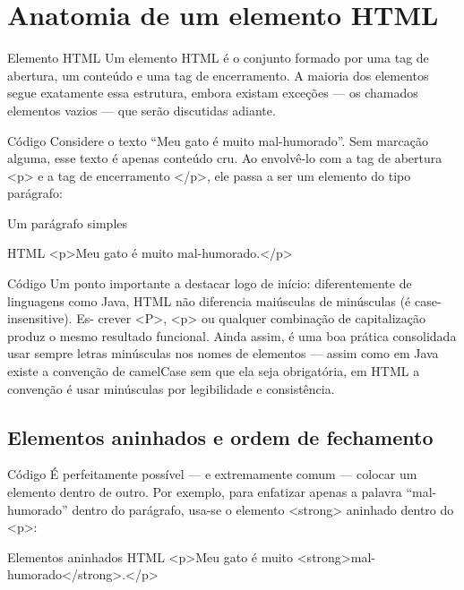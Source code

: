 \section{Anatomia de um elemento HTML}

\begin{infobox}{Elemento HTML}
Um elemento HTML é o conjunto formado por uma tag de abertura, um conteúdo e uma tag de encerramento. A maioria dos elementos segue exatamente essa estrutura, embora existam exceções — os chamados elementos vazios — que serão discutidas adiante.
\end{infobox}

\begin{codebox}{Código}
Considere o texto “Meu gato é muito mal-humorado”. Sem marcação alguma, esse
texto é apenas conteúdo cru. Ao envolvê-lo com a tag de abertura <p> e a tag de
encerramento </p>, ele passa a ser um elemento do tipo parágrafo:
\end{codebox}

Um parágrafo simples

\begin{codebox}{HTML}
   <p>Meu gato é muito mal-humorado.</p>
\end{codebox}

\begin{codebox}{Código}
Um ponto importante a destacar logo de início: diferentemente de linguagens como
Java, HTML não diferencia maiúsculas de minúsculas (é case-insensitive). Es-
crever <P>, <p> ou qualquer combinação de capitalização produz o mesmo resultado
funcional. Ainda assim, é uma boa prática consolidada usar sempre letras minúsculas
nos nomes de elementos — assim como em Java existe a convenção de camelCase sem
que ela seja obrigatória, em HTML a convenção é usar minúsculas por legibilidade e
consistência.
\end{codebox}

\subsection{Elementos aninhados e ordem de fechamento}

\begin{codebox}{Código}
É perfeitamente possível — e extremamente comum — colocar um elemento dentro
de outro. Por exemplo, para enfatizar apenas a palavra “mal-humorado” dentro do
parágrafo, usa-se o elemento <strong> aninhado dentro do <p>:
\end{codebox}

\begin{codebox}{Elementos aninhados}
HTML
<p>Meu gato é muito <strong>mal-humorado</strong>.</p>
\end{codebox}

